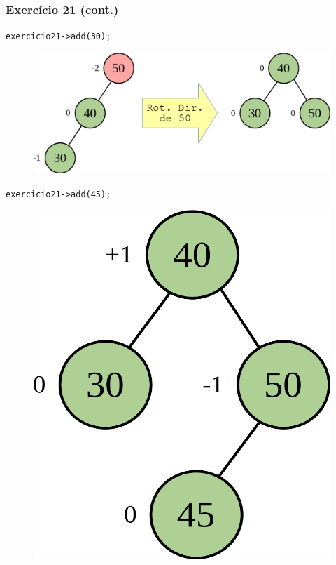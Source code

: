 \documentclass[aspectratio=169]{beamer}
\begin{document}
\begin{frame}[fragile]\frametitle{Exercício 21 (cont.)}
\texttt{exercicio21->add(30);}
\begin{figure}[h]
	\centering
	\includegraphics[height=0.25\paperheight]{imagens/avl-exercicio21c.png}
\end{figure}
\texttt{exercicio21->add(45);}
\begin{figure}[h]
	\centering
	\includegraphics[height=0.25\paperheight]{imagens/avl-exercicio21d.png}
\end{figure}
\end{frame}
\end{document}
